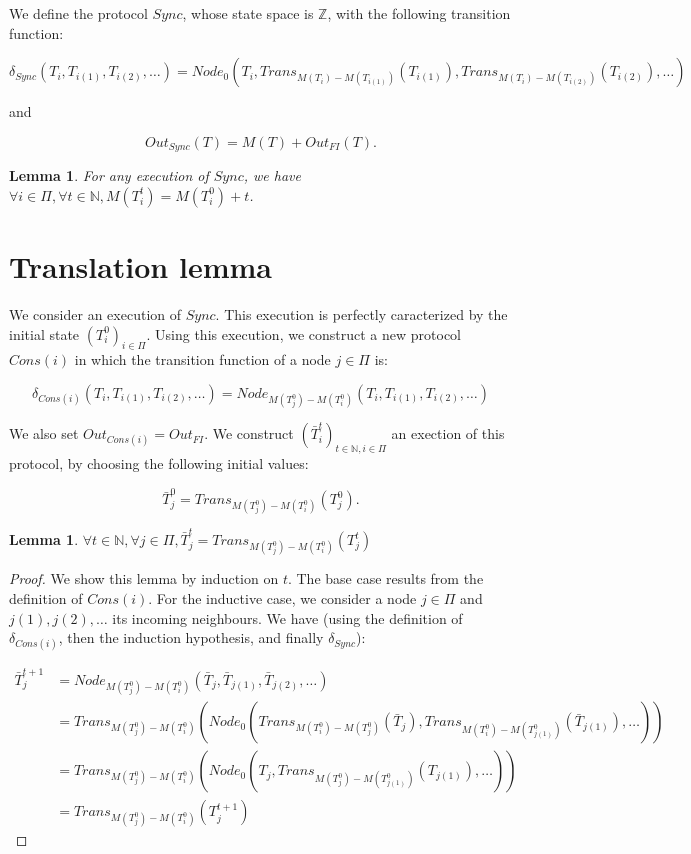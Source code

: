 \documentclass[11pt,letterpaper]{article}
\newtheorem{lem}[thm]{Lemma}
\begin{document}
We define the protocol $Sync$, whose state space is $\mathds{Z}$, with the following transition function:

$$\delta_{Sync}(T_i, T_{i(1)}, T_{i(2)}, \dots) = Node_0(T_i, Trans_{M(T_i)-M(T_{i(1)})}(T_{i(1)}), Trans_{M(T_i)-M(T_{i(2)})}(T_{i(2)}), \dots)$$

and

$$Out_{Sync}(T) = M(T) + Out_{FI}(T).$$

\begin{lem}
	For any execution of $Sync$, we have $\forall i \in \Pi, \forall t \in \mathds{N}, M(T_i^t) = M(T_i^0)+t$.
\end{lem}

\section{Translation lemma}

We consider an execution of $Sync$.
This execution is perfectly caracterized by the initial state $(T_i^0)_{i \in \Pi}$.
Using this execution, we construct a new protocol $Cons(i)$ in which the transition function of a node $j \in \Pi$ is:

$$\delta_{Cons(i)}(T_i, T_{i(1)}, T_{i(2)}, \dots) = Node_{M(T_j^0)-M(T_i^0)}(T_i, T_{i(1)}, T_{i(2)}, \dots)$$

\noindent We also set $Out_{Cons(i)} = Out_{FI}$.
We construct $(\bar T_i^t)_{t \in \mathds{N}, i \in \Pi}$ an exection of this protocol, by choosing the following initial values:

$$\bar{T}_j^0 = Trans_{M(T_j^0) - M(T_i^0)}(T_j^0).$$

\begin{lem}
	$\forall t \in \mathds{N}, \forall j \in \Pi, \bar{T}^t_j = Trans_{M(T_j^0) - M(T_i^0)}(T_j^t)$
\end{lem}
\begin{proof}
	We show this lemma by induction on $t$.
	The base case results from the definition of $Cons(i)$.
	For the inductive case, we consider a node $j \in \Pi$ and $j(1), j(2), \dots$ its incoming neighbours.
	We have (using the definition of $\delta_{Cons(i)}$, then the induction hypothesis, and finally $\delta_{Sync}$):

	\begin{align*}
		\bar T_j^{t+1} &= Node_{M(T^0_j)-M(T^0_i)}(\bar T_j, \bar T_{j(1)}, \bar T_{j(2)}, \dots) \\
		&= Trans_{M(T^0_j)-M(T^0_i)}(Node_0(Trans_{M(T^0_i)-M(T^0_j)}(\bar T_j), Trans_{M(T^0_i)-M(T^0_{j(1)})}(\bar T_{j(1)}),  \dots)) \\
		&= Trans_{M(T^0_j)-M(T^0_i)}(Node_0(T_j, Trans_{M(T^0_j)-M(T^0_{j(1)})}(T_{j(1)}), \dots)) \\
		&= Trans_{M(T^0_j)-M(T^0_i)}(T_j^{t+1})
	\end{align*}
\end{proof}
\end{document}
